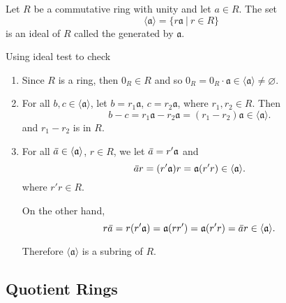 \begin{example}
    Let $R$ be a commutative ring with unity and let $a \in R$. The set 
    \[
        \langle \mathfrak{a} \rangle = \{ r\mathfrak{a} \> | \> r \in R \}
    \]
    is an ideal of $R$ called the  generated by $\mathfrak{a}$.
\end{example}
\begin{solution}
    Using ideal test to check
    \begin{enumerate}
        \item Since $R$ is a ring, then $0_R \in R$ and so $0_R = 0_R \cdot \mathfrak{a} \in \langle \mathfrak{a} \rangle \neq \varnothing$.
        \item For all $b, c \in \langle \mathfrak{a} \rangle$, let $b = r_1 \mathfrak{a}$, $c = r_2 \mathfrak{a}$, where 
        $r_1, r_2 \in R$. Then 
        \[
            b - c = r_1 \mathfrak{a} - r_2 \mathfrak{a} = (r_1 - r_2) \mathfrak{a} \in \langle \mathfrak{a} \rangle.
        \]
        and $r_1 - r_2$ is in $R$.

        \item For all $\,\overline{\!{a}} \in \langle \mathfrak{a} \rangle$, $r \in R$, we let $\,\overline{\!{a}} = r' \mathfrak{a}$ and 
        \[
            \,\overline{\!{a}}r = (r' \mathfrak{a}) r = \mathfrak{a}(r'r) \in \langle \mathfrak{a} \rangle.
        \]
        where $r'r \in R$.

        On the other hand, 
        \[
            r\,\overline{\!{a}} = r(r' \mathfrak{a}) = \mathfrak{a}(rr') = \mathfrak{a}(r'r) = \,\overline{\!{a}} r \in \langle \mathfrak{a} \rangle.
        \]

        Therefore $\langle \mathfrak{a} \rangle$ is a subring of $R$.
    \end{enumerate}
\end{solution}

\subsection{Quotient Rings}

